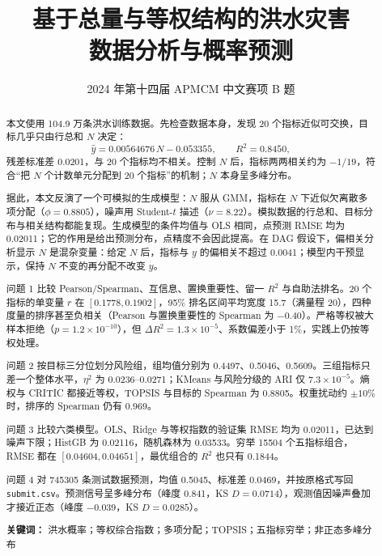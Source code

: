 \documentclass[12pt,a4paper]{ctexart}
\title{\textbf{基于总量与等权结构的洪水灾害\\数据分析与概率预测}}
\author{2024 年第十四届 APMCM 中文赛项 B 题}
\date{}
\begin{document}
\maketitle

\begin{abstract}
本文使用 104.9 万条洪水训练数据。先检查数据本身，发现 20 个指标近似可交换，目标几乎只由行总和 \(N\) 决定：
\[
\hat y=0.00564676\,N-0.053355,\qquad R^2=0.8450,
\]
残差标准差 0.0201，与 20 个指标均不相关。控制 \(N\) 后，指标两两相关约为 \(-1/19\)，符合“把 \(N\) 个计数单元分配到 20 个指标”的机制；\(N\) 本身呈多峰分布。

据此，本文反演了一个可模拟的生成模型：\(N\) 服从 GMM，指标在 \(N\) 下近似欠离散多项分配（\(\phi=0.8805\)），噪声用 Student-\(t\) 描述（\(\nu=8.22\)）。模拟数据的行总和、目标分布与相关结构都能复现。生成模型的条件均值与 OLS 相同，点预测 RMSE 均为 0.02011；它的作用是给出预测分布，点精度不会因此提高。在 DAG 假设下，偏相关分析显示 \(N\) 是混杂变量：给定 \(N\) 后，指标与 \(y\) 的偏相关不超过 0.0041；模型内干预显示，保持 \(N\) 不变的再分配不改变 \(y\)。

问题 1 比较 Pearson/Spearman、互信息、置换重要性、留一 \(R^2\) 与自助法排名。20 个指标的单变量 \(r\) 在 \([0.1778,0.1902]\)，95\% 排名区间平均宽度 15.7（满量程 20），四种度量的排序甚至负相关（Pearson 与置换重要性的 Spearman 为 \(-0.40\)）。严格等权被大样本拒绝（\(p=1.2\times10^{-10}\)），但 \(\Delta R^2=1.3\times10^{-5}\)、系数偏差小于 1\%，实践上仍按等权处理。

问题 2 按目标三分位划分风险组，组均值分别为 0.4497、0.5046、0.5609。三组指标只差一个整体水平，\(\eta^2\) 为 0.0236–0.0271；KMeans 与风险分级的 ARI 仅 \(7.3\times10^{-5}\)。熵权与 CRITIC 都接近等权，TOPSIS 与目标的 Spearman 为 0.8805。权重扰动约 \(\pm10\%\) 时，排序的 Spearman 仍有 0.969。

问题 3 比较六类模型。OLS、Ridge 与等权指数的验证集 RMSE 均为 0.02011，已达到噪声下限；HistGB 为 0.02116，随机森林为 0.03533。穷举 15504 个五指标组合，RMSE 都在 \([0.04604,0.04651]\)，最优组合的 \(R^2\) 也只有 0.1844。

问题 4 对 745305 条测试数据预测，均值 0.5045、标准差 0.0469，并按原格式写回 \texttt{submit.csv}。预测信号呈多峰分布（峰度 0.841，KS \(D=0.0714\)），观测值因噪声叠加才接近正态（峰度 \(-0.039\)，KS \(D=0.0285\)）。

\vspace{0.5em}
\noindent\textbf{关键词：} 洪水概率；等权综合指数；多项分配；TOPSIS；五指标穷举；非正态多峰分布
\end{abstract}
\end{document}
